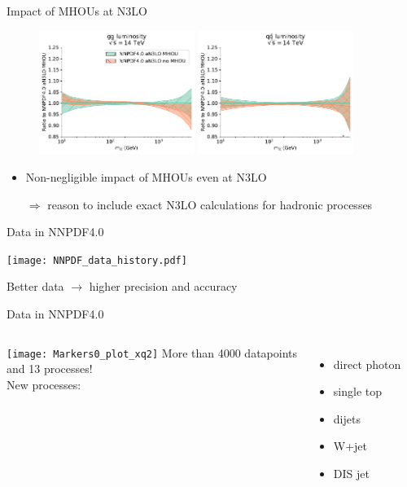 \begin{frame}{Impact of MHOUs at N3LO}
  \begin{figure}[!t]
    \centering
    \includegraphics[width=0.45\textwidth]{figures/gg_plot_lumi1d.pdf}
    \includegraphics[width=0.45\textwidth]{figures/qqbar_plot_lumi1d.pdf}
  \end{figure}
  \begin{itemize}
    \item Non-negligible impact of MHOUs even at N3LO
    \item[$\Rightarrow$] reason to include exact N3LO calculations for hadronic processes
  \end{itemize}
\end{frame}


\begin{frame}[t]{Data in NNPDF4.0}
  \begin{center}
    \texttt{[image: NNPDF\_data\_history.pdf]}
  \end{center}
  Better data $\rightarrow$ higher precision and accuracy
\end{frame}


\begin{frame}[t]{Data in NNPDF4.0}
  \begin{columns}
          \texttt{[image: Markers0\_plot\_xq2]}
          More than 4000 datapoints\\
          and 13 processes!\\
          \vspace*{1em}
          New processes:
          \begin{itemize}
              \item direct photon
              \item single top
              \item dijets
              \item W+jet
              \item DIS jet
          \end{itemize}
  \end{columns}
\end{frame}

